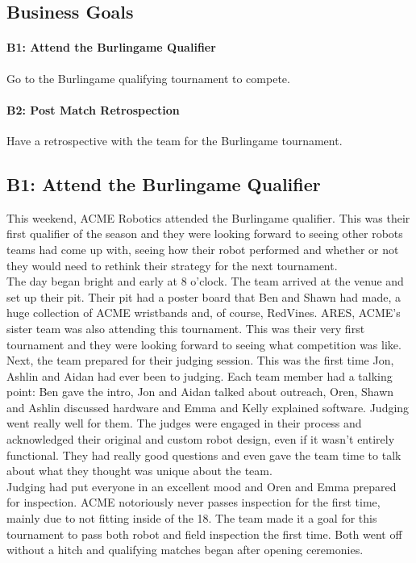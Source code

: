 \documentclass{article}
\begin{document}
\subsection{Business Goals}
\paragraph{B1: Attend the Burlingame Qualifier}
 Go to the Burlingame qualifying tournament to compete.
\paragraph{B2: Post Match Retrospection}
 Have a retrospective with the team for the Burlingame tournament.
\newpage
\subsection{B1: Attend the Burlingame Qualifier}

This weekend, ACME Robotics attended the Burlingame qualifier. This was their first qualifier of the season and they were looking forward to seeing other robots teams had come up with, seeing how their robot performed and whether or not they would need to rethink their strategy for the next tournament.\\

The day began bright and early at 8 o'clock. The team arrived at the venue and set up their pit. Their pit had a poster board that Ben and Shawn had made, a huge collection of ACME wristbands and, of course, RedVines. ARES, ACME's sister team was also attending this tournament. This was their very first tournament and they were looking forward to seeing what competition was like. \\

Next, the team prepared for their judging session. This was the first time Jon, Ashlin and Aidan had ever been to judging. Each team member had a talking point: Ben gave the intro, Jon and Aidan talked about outreach, Oren, Shawn and Ashlin discussed hardware and Emma and Kelly explained software. Judging went really well for them. The judges were engaged in their process and acknowledged their original and custom robot design, even if it wasn't entirely functional. They had really good questions and even gave the team time to talk about what they thought was unique about the team. \\

Judging had put everyone in an excellent mood and Oren and Emma prepared for inspection. ACME notoriously never passes inspection for the first time, mainly due to not fitting inside of the 18. The team made it a goal for this tournament to pass both robot and field inspection the first time. Both went off without a hitch and qualifying matches began after opening ceremonies. \\
\end{document}
